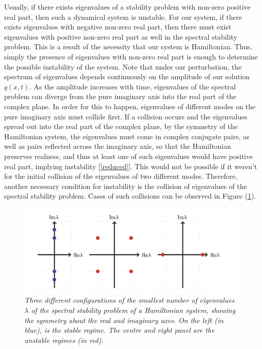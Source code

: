 \documentclass{article}
\begin{document}
Usually, if there exists eigenvalues of a stability problem with non-zero positive real part, then such a dynamical system is unstable. For our system, if there exists eigenvalues with negative non-zero real part, then there must exist eigenvalues with positive non-zero real part as well in the spectral stability problem. This is a result of the necessity that our system is Hamiltonian. Thus, simply the presence of eigenvalues with non-zero real part is enough to determine the possible instability of the system. Note that under our perturbation, the spectrum of eigenvalues depends continuously on the amplitude of our solution \(q(x,t)\). As the amplitude increases with time, eigenvalues of the spectral problem can diverge from the pure imaginary axis into the real part of the complex plane. In order for this to happen, eigenvalues of different modes on the pure imaginary axis must collide first. If a collision occurs and the eigenvalues spread out into the real part of the complex plane, by the symmetry of the Hamiltonian system, the eigenvalues must come in complex conjugate pairs, as well as pairs reflected across the imaginary axis, so that the Hamiltonian preserves realness, and thus at least one of such eigenvalues would have positive real part, implying instability [\ref{reduced}]. This would not be possible if it weren't for the initial collision of the eigenvalues of two different modes. Therefore, another necessary condition for instability is the collision of eigenvalues of the spectral stability problem. Cases of such collisions can be observed in Figure (\ref{eigenvaluesgraph}). \\



\begin{figure}[htp]
\centering
\includegraphics[scale = 0.7]{Eigenvalues.png}
\caption{\emph{Three different configurations of the smallest number of eigenvalues \(\lambda\) of the spectral stability problem of a Hamiltonian system, showing the symmetry about the real and imaginary axes. On the left (in blue), is the stable regime. The centre and right panel are the unstable regimes (in red).}}\label{eigenvaluesgraph}

\end{figure}
\end{document}
